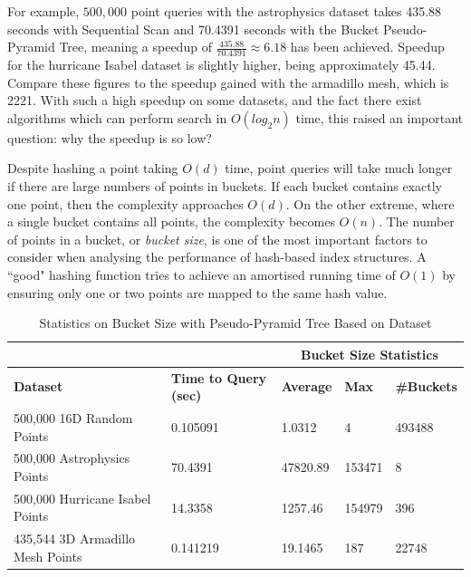 For example, $500,000$ point queries with the astrophysics dataset takes 435.88 seconds with Sequential Scan and 70.4391 seconds with the Bucket Pseudo-Pyramid Tree, meaning a speedup of $\frac{435.88}{70.4391} \approx 6.18$ has been achieved. Speedup for the hurricane Isabel dataset is slightly higher, being approximately 45.44. Compare these figures to the speedup gained with the armadillo mesh, which is 2221. With such a high speedup on some datasets, and the fact there exist algorithms which can perform search in $O(log_2 n)$ time, this raised an important question: why the speedup is so low?

Despite hashing a point taking $O(d)$ time, point queries will take much longer if there are large numbers of points in buckets. If each bucket contains exactly one point, then the complexity approaches $O(d)$. On the other extreme, where a single bucket contains all points, the complexity becomes $O(n)$. The number of points in a bucket, or \textit{bucket size}, is one of the most important factors to consider when analysing the performance of hash-based index structures. A ``good" hashing function tries to achieve an amortised running time of $O(1)$ by ensuring only one or two points are mapped to the same hash value.

\begin{table}
	\centering
	\begin{tabular}{|l|l|l|l|l|}
		\hline
		& & \multicolumn{3}{c|}{\textbf{Bucket Size Statistics}} \\
		\hline
		\textbf{Dataset} & \textbf{Time to Query (sec)} & \textbf{Average} & \textbf{Max} & \textbf{\#Buckets} \\
		\hline
		500,000 16D Random Points & 0.105091 & 1.0312 & 4 & 493488 \\
		500,000 Astrophysics Points & 70.4391 & 47820.89 & 153471 & 8  \\
		500,000 Hurricane Isabel Points & 14.3358 & 1257.46 & 154979 & 396 \\
		435,544 3D Armadillo Mesh Points & 0.141219 & 19.1465 & 187 & 22748 \\
		\hline
	\end{tabular}
	\caption{Statistics on Bucket Size with Pseudo-Pyramid Tree Based on Dataset}
	\label{tab:perf1-bucket-stats}
\end{table}

